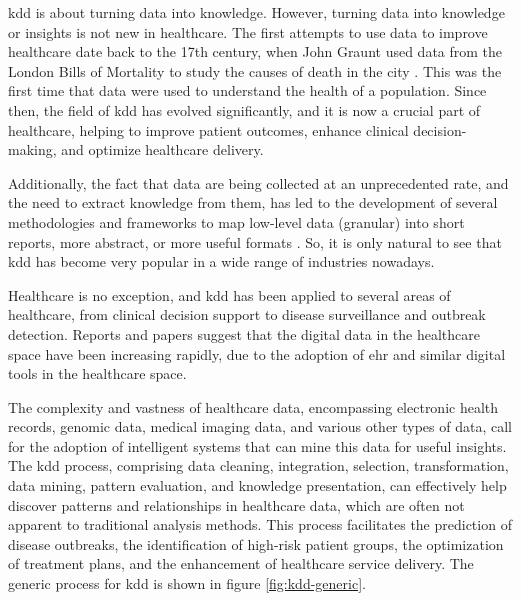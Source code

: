 
\ac{kdd} is about turning data into knowledge. However, turning data into knowledge or insights is not new in healthcare. The first attempts to use data to improve healthcare date back to the 17th century, when John Graunt used data from the London Bills of Mortality to study the causes of death in the city \cite{741e4dcd-5d3c-325c-9241-5eb5ddd0cb60}. This was the first time that data were used to understand the health of a population. Since then, the field of \ac{kdd} has evolved significantly, and it is now a crucial part of healthcare, helping to improve patient outcomes, enhance clinical decision-making, and optimize healthcare delivery.

Additionally, the fact that data are being collected at an unprecedented rate, and the need to extract knowledge from them, has led to the development of several methodologies and frameworks to map low-level data (granular) into short reports, more abstract, or more useful formats \cite{Fayyad_Piatetsky-Shapiro_Smyth_1996}. So, it is only natural to see that \ac{kdd} has become very popular in a wide range of industries nowadays.

Healthcare is no exception, and \ac{kdd} has been applied to several areas of healthcare, from clinical decision support to disease surveillance and outbreak detection. Reports and papers suggest that \cite{dashBigDataHealthcare2019} the digital data in the healthcare space have been increasing rapidly, due to the adoption of \ac{ehr} and similar digital tools in the healthcare space. 

The complexity and vastness of healthcare data, encompassing electronic health records, genomic data, medical imaging data, and various other types of data, call for the adoption of intelligent systems that can mine this data for useful insights. The \ac{kdd} process, comprising data cleaning, integration, selection, transformation, data mining, pattern evaluation, and knowledge presentation, can effectively help discover patterns and relationships in healthcare data, which are often not apparent to traditional analysis methods. This process facilitates the prediction of disease outbreaks, the identification of high-risk patient groups, the optimization of treatment plans, and the enhancement of healthcare service delivery. The generic process for \ac{kdd} is shown in figure \ref{fig:kdd-generic}.

